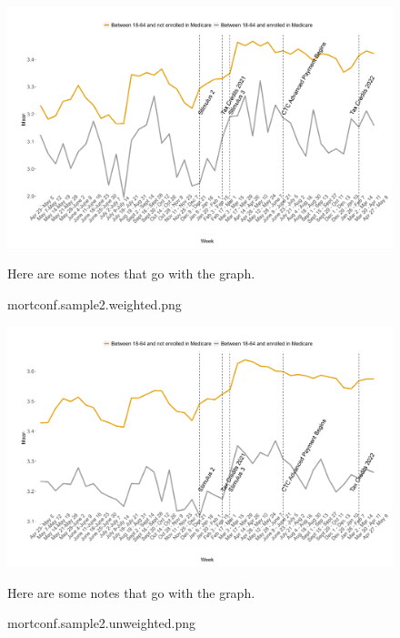 \documentclass[12pt]{article}
\begin{document}
\begin{figure}[!ht]\label{mortconf.sample2.weighted.png}
\caption{mortconf.sample2.weighted.png}
\centering
\includegraphics[scale=0.3]{mortconf.sample2.weighted.png}
\medskip 
\begin{minipage}{0.65\textwidth} 
{\footnotesize Here are some notes that go with the graph.  \par}
\end{minipage}
\end{figure}

\begin{figure}[!ht]\label{mortconf.sample2.unweighted.png}
\caption{mortconf.sample2.unweighted.png}
\centering
\includegraphics[scale=0.3]{mortconf.sample2.unweighted.png}
\medskip 
\begin{minipage}{0.65\textwidth} 
{\footnotesize Here are some notes that go with the graph.  \par}
\end{minipage}
\end{figure}
\end{document}
